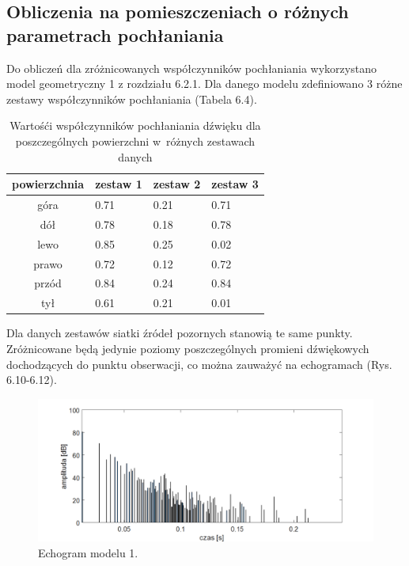 
\subsection{Obliczenia na pomieszczeniach o różnych parametrach pochłaniania}\label{sec:imstest2}

Do obliczeń dla zróżnicowanych współczynników pochłaniania wykorzystano model geometryczny 1 z rozdziału 6.2.1. Dla danego modelu zdefiniowano 3 różne zestawy współczynników pochłaniania (Tabela 6.4).

\begin{table}[H]
        \centering
        \begin{threeparttable}
                \caption{Wartośći współczynników pochłaniania dźwięku dla poszczególnych powierzchni w~różnych zestawach danych}\label{tab:table_example}
                \begin{tabularx}{0.6\textwidth}{| c | X | X | X |}
                        \toprule
                        	powierzchnia &	zestaw 1 & zestaw 2 & zestaw 3 \\
                       \midrule
		góra & 0.71 & 0.21 & 0.71 \\
                        dół & 0.78 & 0.18 & 0.78 \\
		lewo & 0.85 & 0.25 & 0.02 \\
                     prawo & 0.72 & 0.12 & 0.72 \\
		przód & 0.84 & 0.24 & 0.84 \\
                    tył & 0.61 & 0.21 & 0.01 \\
                        \bottomrule
                \end{tabularx}
        \end{threeparttable}
\end{table}

Dla danych zestawów siatki źródeł pozornych stanowią te same punkty. Zróżnicowane będą jedynie poziomy poszczególnych promieni dźwiękowych dochodzących do punktu obserwacji, co można zauważyć na echogramach (Rys. 6.10-6.12).

\begin{figure}[H]
        \centering
                \centering
                \includegraphics[width=16cm]{echoz1}
	\caption{Echogram modelu 1.}
\end{figure}


